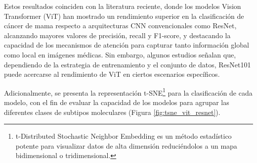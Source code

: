 \documentclass[a4paper,10pt]{book}
\begin{document}
Estos resultados coinciden con la literatura reciente, donde los modelos Vision Transformer (ViT) han mostrado un rendimiento superior en la clasificación de cáncer de mama respecto a arquitecturas CNN convencionales como ResNet, alcanzando mayores valores de precisión, recall y F1-score, y destacando la capacidad de los mecanismos de atención para capturar tanto información global como local en imágenes médicas. Sin embargo, algunos estudios señalan que, dependiendo de la estrategia de entrenamiento y el conjunto de datos, ResNet101 puede acercarse al rendimiento de ViT en ciertos escenarios específicos.

Adicionalmente, se presenta la representación t-SNE\footnote{t-Distributed Stochastic Neighbor Embedding es un método estadístico potente para visualizar datos de alta dimensión reduciéndolos a un mapa bidimensional o tridimensional.} para la clasificación de cada modelo, con el fin de evaluar la capacidad de los modelos para agrupar las diferentes clases de subtipos moleculares (Figura \ref{fig:tsne_vit_resnet}).
\end{document}
